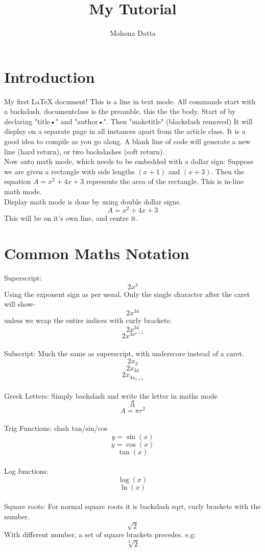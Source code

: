 \documentclass[11pt]{report}
\begin{document}
\title{My Tutorial}
\author{Mohona Datta}
\maketitle
\tableofcontents
\chapter{Introduction}
My first LaTeX document!
This is a line in text mode. 
All commands start with a backslash.
documentclass is the preamble, this the the body. 
Start of by declaring "title{•}" and "author{•}". Then "maketitle" (blackslash removed) It will display on a separate page in all instances apart from the article class. 
It is a good idea to compile as you go along.
A blank line of code will generate a new line (hard return), or two backslashes (soft return).\\
Now onto math mode, which needs to be embedded with a dollar sign:
Suppose we are given a rectangle with side lengths $(x+1)$ and $(x+3)$. Then the equation $A=x^2+4x+3$ represents the area of the rectangle. This is in-line math mode.\\
Display math mode is done by using double dollar signs.
$$A=x^2+4x+3$$
This will be on it's own line, and centre it.
\chapter{Common Maths Notation}
Superscript: 
$$2x^3$$ Using the exponent sign as per usual. Only the single character after the caret will show- $$2x^34$$ unless we wrap the entire indices with curly brackets: $$2x^{34}$$
$$2x^{3x^{4+5}}$$
\\Subscript:
Much the same as superscript, with underscore instead of a caret.
$$2x_3$$
$$2x_{34}$$
$$2x_{3x_{4+5}}$$
\\Greek Letters: Simply backslash and write the letter in maths mode
$$\pi$$
$$\alpha$$
$$A=\pi r^2$$
\\Trig Functions: slash tan/sin/cos
$$y=\sin(x)$$
$$y=\cos(x)$$
$$\tan (x) $$
\\Log functions:
$$\log(x)$$
$$\ln(x)$$
\\Square roots:
For normal square roots it is backslash sqrt, curly brackets with the number.
$$\sqrt{2}$$
With different number, a set of square brackets precedes. e.g: 
$$\sqrt[3]{2}$$
\end{document}
